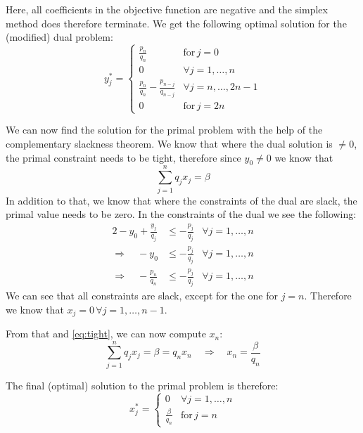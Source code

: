 \documentclass[a4paper,12pt,headsepline]{scrartcl}
\begin{document}
Here, all coefficients in the objective function are negative and the simplex method does therefore terminate.
We get the following optimal solution for the (modified) dual problem:
\[ y^*_j = \begin{cases}\frac{p_n}{q_n}&\text{for}\,j=0\\0&\forall j=1,\dots,n\\\frac{p_n}{q_n}-\frac{p_{n-j}}{q_{n-j}}&\forall j=n,\dots,2n-1\\0&\text{for}\,j=2n\end{cases} \]

We can now find the solution for the primal problem with the help of the complementary slackness theorem.
We know that where the dual solution is $\neq 0$, the primal constraint needs to be tight, therefore since $y_0\neq 0$ we know that
\begin{equation}\label{eq:tight}
	\sum_{j=1}^n q_jx_j=\beta
\end{equation}
In addition to that, we know that where the constraints of the dual are slack, the primal value needs to be zero.
In the constraints of the dual we see the following:
\begin{alignat*}{2}
	-y_0+\frac{y_j}{q_j} &\le -\frac{p_j}{q_j} & \forall j=1,\dots,n \\
	\Rightarrow\quad -y_0 &\le -\frac{p_j}{q_j} & \forall j=1,\dots,n \\
	\Rightarrow\quad -\frac{p_n}{q_n} &\le -\frac{p_j}{q_j} & \forall j=1,\dots,n
\end{alignat*}
We can see that all constraints are slack, except for the one for $j=n$.
Therefore we know that $x_j = 0\,\forall j=1,\dots,n-1$.

From that and \eqref{eq:tight}, we can now compute $x_n$:
\[ \sum_{j=1}^n q_jx_j = \beta = q_nx_n \quad\Rightarrow\quad x_n=\frac{\beta}{q_n} \]

The final (optimal) solution to the primal problem is therefore:
\[ x^*_j = \begin{cases}0&\forall j=1,\dots,n\\\frac{\beta}{q_n}&\text{for}\,j=n\end{cases} \]
\end{document}
